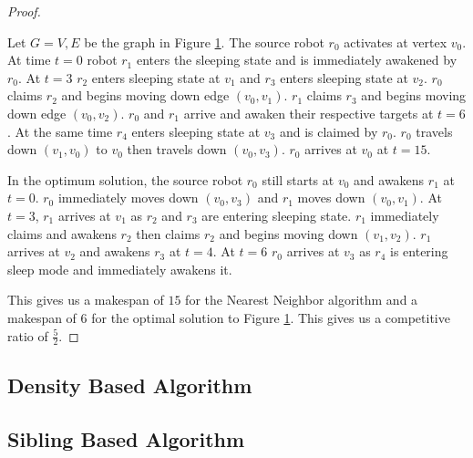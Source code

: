 \documentclass[twoside]{article}
\begin{document}
\begin{multicols}{2}
\begin{proof}
\begin{figure}[H]
	\caption{}
	\label{fig:1}
	
\end{figure}

Let $G = {V, E}$ be the graph in Figure \ref{fig:1}. The source robot $r_0$ activates at vertex  $v_0$. At time $t = 0$ robot $r_1$ enters the sleeping state and is immediately awakened by $r_0$. At $t = 3$ $r_2$ enters sleeping state at $v_1$ and $r_3$ enters sleeping state at $v_2$. $r_0$ claims $r_2$ and begins moving down edge $(v_0, v_1)$. $r_1$ claims $r_3$ and begins moving down edge $(v_0, v_2)$. $r_0$ and $r_1$ arrive and awaken their respective targets at $t = 6$. At the same time $r_4$ enters sleeping state at $v_3$ and is claimed by $r_0$. $r_0$ travels down $(v_1, v_0)$ to $v_0$ then travels down $(v_0, v_3)$. $r_0$ arrives at $v_0$ at $t = 15$.

In the optimum solution, the source robot $r_0$ still starts at $v_0$ and awakens $r_1$ at $t = 0$. $r_0$ immediately moves down $(v_0, v_3)$ and $r_1$ moves down $(v_0, v_1)$. At $t = 3$, $r_1$ arrives at $v_1$ as $r_2$ and $r_3$ are entering sleeping state. $r_1$ immediately claims and awakens $r_2$ then claims $r_2$ and begins moving down $(v_1, v_2)$. $r_1$ arrives at $v_2$ and awakens $r_3$ at $t = 4$. At $t = 6$ $r_0$ arrives at $v_3$ as $r_4$ is entering sleep mode and immediately awakens it. 

This gives us a makespan of $15$ for the Nearest Neighbor algorithm and a makespan of 6 for the optimal solution to Figure \ref{fig:1}. This gives us a competitive ratio of  $\frac{5}{2}.$
\end{proof}


\subsection{Density Based Algorithm}

\subsection{Sibling Based Algorithm}






{}



\end{multicols}
\end{document}

